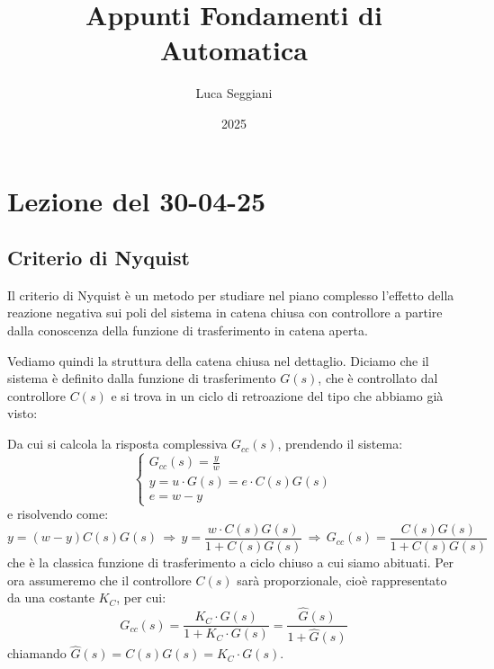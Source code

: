 \documentclass[a4paper,11pt]{article}
\title{Appunti Fondamenti di Automatica}
\author{Luca Seggiani}
\date{2025}
\begin{document}
\section{Lezione del 30-04-25}

\thispagestyle{empty}
\pagestyle{fancy}

\subsection{Criterio di Nyquist}
Il criterio di Nyquist è un metodo per studiare nel piano complesso l'effetto della reazione negativa sui poli del sistema in catena chiusa con controllore a partire dalla conoscenza della funzione di trasferimento in catena aperta.

Vediamo quindi la struttura della catena chiusa nel dettaglio.
Diciamo che il sistema è definito dalla funzione di trasferimento $G(s)$, che è controllato dal controllore $C(s)$ e si trova in un ciclo di retroazione del tipo che abbiamo già visto:
\begin{center}
\end{center}

Da cui si calcola la risposta complessiva $G_{cc}(s)$, prendendo il sistema:
\[
	\begin{cases}
		G_{cc}(s) = \frac{y}{w} \\ 
		y = u \cdot G(s) = e \cdot C(s) G(s) \\ 
		e = w - y
	\end{cases}
\]
e risolvendo come:
$$
y = (w - y) C(s) G(s) \, \Rightarrow \, y = \frac{w \cdot C(s) G(s)}{1 + C(s)G(s)} \, \Rightarrow \, G_{cc}(s) = \frac{C(s) G(s)}{1 + C(s)G(s)}
$$
che è la classica funzione di trasferimento a ciclo chiuso a cui siamo abituati.
Per ora assumeremo che il controllore $C(s)$ sarà proporzionale, cioè rappresentato da una costante $K_C$, per cui:
$$
G_{cc}(s) = \frac{K_C \cdot G(s)}{1 + K_C \cdot G(s)} = \frac{\hat{G}(s)}{1 + \hat{G}(s)}
$$
chiamando $\hat{G}(s) = C(s) G(s) = K_C \cdot G(s)$.
\end{document}
